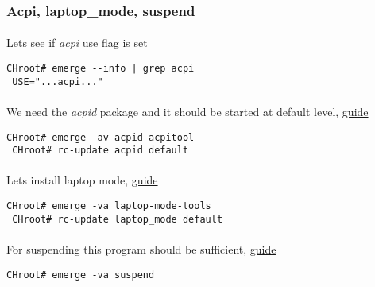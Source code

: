 \documentclass[11pt,a4paper]{article}
\begin{document}
                \newpage
                \subsubsection{Acpi, laptop\_mode, suspend}

                    \paragraph{} Lets see if \textit{acpi} use flag is set

                    \begin{lstlisting}[style=BashInputCHRoot]
 CHroot# emerge --info | grep acpi
 USE="...acpi..."
                    \end{lstlisting}

                    \paragraph{} We need the \textit{acpid} package and it should be started at default level, \href{https://wiki.gentoo.org/wiki/ACPI#Emerge}{guide}

                    \begin{lstlisting}[style=BashInputCHRoot]
 CHroot# emerge -av acpid acpitool
 CHroot# rc-update acpid default
                    \end{lstlisting}

                    \paragraph{} Lets install laptop mode, \href{https://wiki.gentoo.org/wiki/Power\_management/Guide#Installation}{guide}

                    \begin{lstlisting}[style=BashInputCHRoot]
 CHroot# emerge -va laptop-mode-tools
 CHroot# rc-update laptop_mode default
                    \end{lstlisting}

                    \paragraph{} For suspending this program should be sufficient, \href{https://wiki.gentoo.org/wiki/Suspend\_and\_hibernate#Software}{guide}

                    \begin{lstlisting}[style=BashInputCHRoot]
 CHroot# emerge -va suspend
                    \end{lstlisting}
\end{document}
